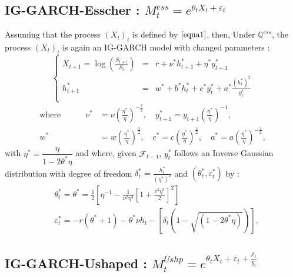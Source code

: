 \documentclass[preprint,times,12pt]{elsarticle}
\begin{document}
\subsection{ IG-GARCH-Esscher : $M^{ess}_{t}=e^{\theta_{t}X_{t}+\varepsilon_{t}}$}

Assuming that the process $(X_{t})_{t}$ is defined by $\ref{equa1}$, then, Under $\mathbb{Q}^{ess}$, the process $(X_{t})_{t}$ is again an IG-GARCH model with changed parameters :
\begin{equation}\label{Lineker}
\left\{
  \begin{array}{rcl}
X_{t+1}=\log\left(\frac{S_{t+1}}{S_{t}}\right) & = &  r +\nu^{*} h^{*}_{t+1} +\eta^{*} y^{*}_{t+1} \\
h^{*}_{t+1}& = &w^{*}+b^{*}h^{*}_{t} + c^{*}y^{*}_{t} +a^{*}\frac{(h^{*}_{t})^{2}}{y^{*}_{t}}\\
  \end{array}
\right.
\end{equation}
\begin{equation*}
\begin{array}{rl}
\text{where} \qquad \quad\nu^{*}&=\nu\left(\frac{\eta^{*}}{\eta}\right)^{-\frac{3}{2}},\quad y^{*}_{t+1}=y_{t+1}\left(\frac{\eta^{*}}{\eta}\right)^{-1},\\
 w^{*}&=w\left(\frac{\eta^{*}}{\eta}\right)^{\frac{3}{2}},\quad c^{*}=c\left(\frac{\eta^{*}}{\eta}\right)^{\frac{5}{2}}, \quad a^{*}=a\left(\frac{\eta^{*}}{\eta}\right)^{-\frac{5}{2}},
\end{array}
\end{equation*}with $\eta^{*}=\dfrac{\eta}{1-2\theta^*\eta}$
and where, given  $\mathcal{F}_{t-1}$, $y_{t}^{*}$ follows an Inverse Gaussian distribution with degree of freedom  $\delta^*_{t}=\frac{h^*_{t}}{(\eta^*)^{2}}$ and $(\theta^{*}_t,\varepsilon_{t}^{*})$  by :
\begin{equation*}
\begin{array}{cl}
&\theta^{*}_t=\theta^{*}=\frac{1}{2}\left[ \eta^{-1}-\frac{1}{\nu^{2} \eta^{3}}\left[1+\frac{\nu^{2} \eta^{3}}{2} \right]^{2}\right]\\
&\varepsilon_{t}^{*}=-r(\theta^{*}+1)-\theta^{*}\nu h_{t} - \left[ \delta_{t}\left(1-\sqrt{(1-2\theta^{*}\eta)}\right) \right].
\end{array}
\end{equation*} 



\subsection{IG-GARCH-Ushaped : $ M^{Ushp}_{t}=e^{\theta_{t}X_{t}+\varepsilon_{t}+\frac{\rho_{t}}{y_{t}}}$}
\end{document}
